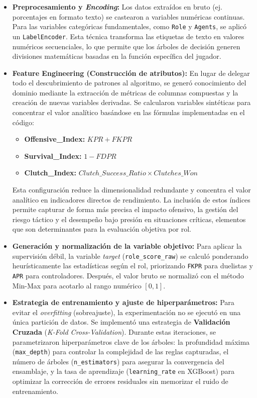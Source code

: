 \documentclass{ULBreport} %
\begin{document}
\begin{itemize}
    \item \textbf{Preprocesamiento y \textit{Encoding}:} Los datos extraídos en bruto (ej. porcentajes en formato texto) se castearon a variables numéricas continuas. Para las variables categóricas fundamentales, como \texttt{Role} y \texttt{Agents}, se aplicó un \texttt{LabelEncoder}. Esta técnica transforma las etiquetas de texto en valores numéricos secuenciales, lo que permite que los árboles de decisión generen divisiones matemáticas basadas en la función específica del jugador.

    \item \textbf{Feature Engineering (Construcción de atributos):} En lugar de delegar todo el descubrimiento de patrones al algoritmo, se generó conocimiento del dominio mediante la extracción de métricas de columnas compuestas y la creación de nuevas variables derivadas. Se calcularon variables sintéticas para concentrar el valor analítico basándose en las fórmulas implementadas en el código:

    \begin{itemize}
        \item \textbf{Offensive\_Index:} $KPR + FKPR$
        \item \textbf{Survival\_Index:} $1 - FDPR$
        \item \textbf{Clutch\_Index:} $Clutch\_Success\_Ratio \times Clutches\_Won$
    \end{itemize}

    Esta configuración reduce la dimensionalidad redundante y concentra el valor analítico en indicadores directos de rendimiento. La inclusión de estos índices permite capturar de forma más precisa el impacto ofensivo, la gestión del riesgo táctico y el desempeño bajo presión en situaciones críticas, elementos que son determinantes para la evaluación objetiva por rol.
    
    \item \textbf{Generación y normalización de la variable objetivo:} Para aplicar la supervisión débil, la variable \textit{target} (\texttt{role\_score\_raw}) se calculó ponderando heurísticamente las estadísticas según el rol, priorizando \texttt{FKPR} para duelistas y \texttt{APR} para controladores. Después, el valor bruto se normalizó con el método Min-Max para acotarlo al rango numérico $[0,1]$. 
    
    \item \textbf{Estrategia de entrenamiento y ajuste de hiperparámetros:} Para evitar el \textit{overfitting} (sobreajuste), la experimentación no se ejecutó en una única partición de datos. Se implementó una estrategia de \textbf{Validación Cruzada} (\textit{K-Fold Cross-Validation}). Durante estas iteraciones, se parametrizaron hiperparámetros clave de los árboles: la profundidad máxima (\texttt{max\_depth}) para controlar la complejidad de las reglas capturadas, el número de árboles (\texttt{n\_estimators}) para asegurar la convergencia del ensamblaje, y la tasa de aprendizaje (\texttt{learning\_rate} en XGBoost) para optimizar la corrección de errores residuales sin memorizar el ruido de entrenamiento.
\end{itemize}
\end{document}
